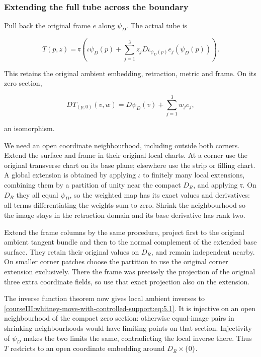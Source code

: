 \subsubsection{Extending the full tube across the boundary}
\label{courseIII:whitney-move-with-controlled-support:section-5.1}

Pull back the original frame \(e\) along \(\psi_D\). The actual tube is

\begin{equation}
T(p,z)=\mathfrak r\left(
\iota\psi_D(p)+\sum_{j=1}^3z_jD\iota_{\psi_D(p)}e_j(\psi_D(p))
\right).
\label{courseIII:whitney-move-with-controlled-support:eq:5.1}
\end{equation}

This retains the original ambient embedding, retraction, metric and frame. On its zero section,

\begin{equation}
DT_{(p,0)}(v,w)=D\psi_D(v)+\sum_{j=1}^3w_je_j,
\label{courseIII:whitney-move-with-controlled-support:eq:5.2}
\end{equation}

an isomorphism.

We need an open coordinate neighbourhood, including outside both corners. Extend the surface and frame in their original local charts. At a corner use the original transverse chart on its base plane; elsewhere use the strip or filling chart. A global extension is obtained by applying \(\iota\) to finitely many local extensions, combining them by a partition of unity near the compact \(D_R\), and applying \(\mathfrak r\). On \(D_R\) they all equal \(\psi_D\), so the weighted map has its exact values and derivatives: all terms differentiating the weights sum to zero. Shrink the neighbourhood so the image stays in the retraction domain and its base derivative has rank two.

Extend the frame columns by the same procedure, project first to the original ambient tangent bundle and then to the normal complement of the extended base surface. They retain their original values on \(D_R\), and remain independent nearby. On smaller corner patches choose the partition to use the original corner extension exclusively. There the frame was precisely the projection of the original three extra coordinate fields, so use that exact projection also on the extension.

The inverse function theorem now gives local ambient inverses to \eqref{courseIII:whitney-move-with-controlled-support:eq:5.1}. It is injective on an open neighbourhood of the compact zero section: otherwise equal-image pairs in shrinking neighbourhoods would have limiting points on that section. Injectivity of \(\psi_D\) makes the two limits the same, contradicting the local inverse there. Thus \(T\) restricts to an open coordinate embedding around \(D_R\times\{0\}\).

